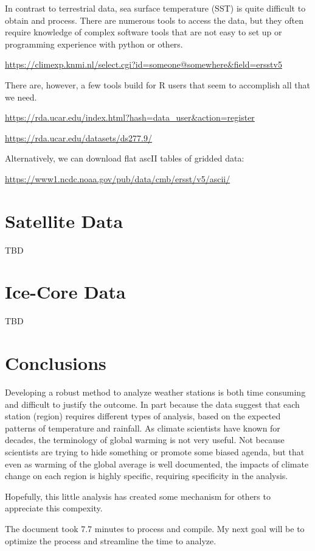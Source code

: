 \documentclass{article}\usepackage[]{graphicx}\usepackage[]{color}
\begin{document}
In contrast to terrestrial data, sea surface temperature (SST) is quite difficult to obtain and process. There are numerous tools to access the data, but they often require knowledge of complex software tools that are not easy to set up or programming experience with python or others.

\url{https://climexp.knmi.nl/select.cgi?id=someone@somewhere&field=ersstv5}

There are, however, a few tools build for R users that seem to accomplish all that we need. 

\url{https://rda.ucar.edu/index.html?hash=data_user&action=register}

\url{https://rda.ucar.edu/datasets/ds277.9/}

Alternatively, we can download flat ascII tables of gridded data:

\url{https://www1.ncdc.noaa.gov/pub/data/cmb/ersst/v5/ascii/}




\section{Satellite Data}

TBD

\section{Ice-Core Data}

TBD

\section{Conclusions}

Developing a robust method to analyze weather stations is both time consuming and difficult to justify the outcome. In part because the data suggest that each station (region) requires different types of analysis, based on the expected patterns of temperature and rainfall. As climate scientists have known for decades, the terminology of global warming is not very useful. Not because scientists are trying to hide something or promote some biased agenda, but that even as warming of the global average is well documented, the impacts of climate change on each region is highly specific, requiring specificity in the analysis. 

Hopefully, this little analysis has created some mechanism for others to appreciate this compexity. 



The document took 7.7 minutes to process and compile. My next goal will be to optimize the process and streamline the time to analyze. 
\end{document}
